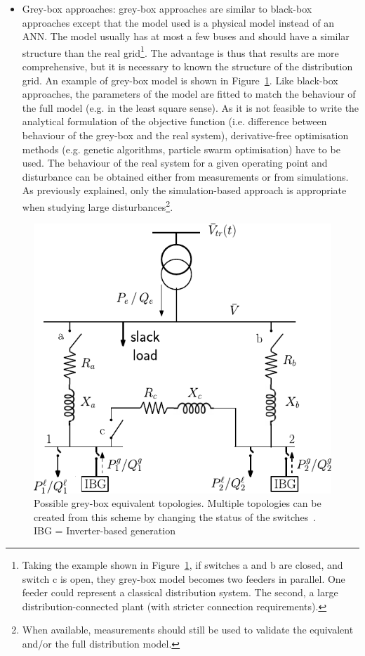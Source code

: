 \begin{itemize}
    \item Grey-box approaches: grey-box approaches are similar to black-box approaches except that the model used is a physical model instead of an ANN. The model usually has at most a few buses and should have a similar structure than the real grid\footnote{Taking the example shown in Figure~\ref{fig:greyBox}, if switches a and b are closed, and switch c is open, they grey-box model becomes two feeders in parallel. One feeder could represent a classical distribution system. The second, a large distribution-connected plant (with stricter connection requirements).}. The advantage is thus that results are more comprehensive, but it is necessary to known  the structure of the distribution grid. An example of grey-box model is shown in Figure~\ref{fig:greyBox}. Like black-box approaches, the parameters of the model are fitted to match the behaviour of the full model (e.g. in the least square sense). As it is not feasible to write the analytical formulation of the objective function (i.e. difference between behaviour of the grey-box and the real system), derivative-free optimisation methods (e.g. genetic algorithms, particle swarm optimisation) have to be used. The behaviour of the real system for a given operating point and disturbance can be obtained either from measurements or from simulations. As previously explained, only the simulation-based approach is appropriate when studying large disturbances\footnote{When available, measurements should still be used to validate the equivalent and/or the full distribution model.}.
\end{itemize}

\begin{figure}
    \centering
    \includegraphics[width=0.6\linewidth]{Figs/GreyBoxEquivalent.pdf}
    \caption{Possible grey-box equivalent topologies. Multiple topologies can be created from this scheme by changing the status of the switches~\cite{ChaspierreThesis}. IBG = Inverter-based generation}
    \label{fig:greyBox}
\end{figure}



